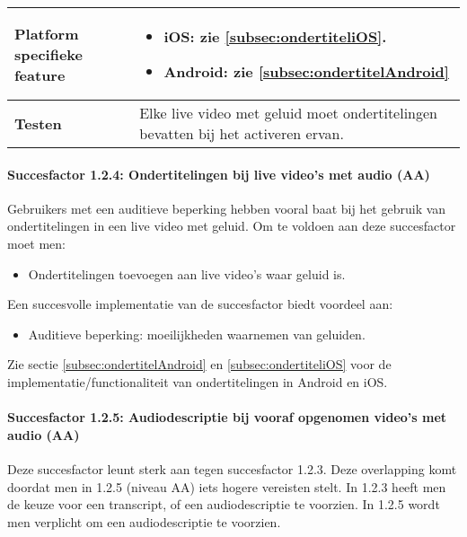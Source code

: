 \begin{table}[H]
\begin{tabular}{|l|p{12cm}|}
        \hline
        \textbf{Platform specifieke feature} & \begin{itemize}
            \item iOS: zie \ref{subsec:ondertiteliOS}.
            \item Android: zie \ref{subsec:ondertitelAndroid}
        \end{itemize}                                                                                                                                                                       \\ 
        \hline
        \textbf{Testen}                      & Elke live video met geluid moet ondertitelingen bevatten bij het activeren ervan.                                                                                                                                                                                    \\
        \hline
    \end{tabular}
\end{table}

\paragraph{Succesfactor 1.2.4: Ondertitelingen bij live video's met audio (AA)}
Gebruikers met een auditieve beperking hebben vooral baat bij het gebruik van ondertitelingen in een live video met geluid. Om te voldoen aan deze succesfactor moet men: 
\begin{itemize}
    \item Ondertitelingen toevoegen aan live video's waar geluid is.
\end{itemize}
Een succesvolle implementatie van de succesfactor biedt voordeel aan:
\begin{itemize}
    \item Auditieve beperking: moeilijkheden waarnemen van geluiden.
\end{itemize}

Zie sectie \ref{subsec:ondertitelAndroid} en \ref{subsec:ondertiteliOS} voor de implementatie/functionaliteit van ondertitelingen in Android en iOS. 

\paragraph{Succesfactor 1.2.5: Audiodescriptie bij vooraf opgenomen video's met audio (AA)}
Deze succesfactor leunt sterk aan tegen succesfactor 1.2.3. Deze overlapping komt doordat men in 1.2.5 (niveau AA) iets hogere vereisten stelt. 
In 1.2.3 heeft men de keuze voor een transcript, of een audiodescriptie te voorzien. In 1.2.5 wordt men verplicht om een audiodescriptie te voorzien. 

